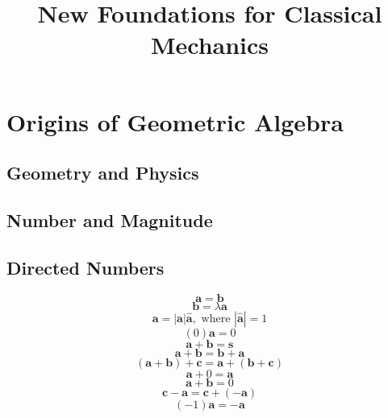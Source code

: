 \documentclass[11pt, a4paper, fleqn]{report}
\title{New Foundations for Classical Mechanics}
\numberwithin{equation}{section}
\def\*#1{\mathbf{#1}}
\begin{document}
\maketitle
\chapter{Origins of Geometric Algebra}
\section{Geometry and Physics}
\section{Number and Magnitude}
\section{Directed Numbers}
\begin{equation}
    \*a = \*b
\end{equation}
\begin{equation}
    \*b = \lambda\*a
\end{equation}
\begin{equation}
    \*a = |\*a|\hat{\*a}, \textrm{ where } |\hat{\*a}|=1
\end{equation}
\begin{equation}
    (0)\*a=0
\end{equation}
\begin{equation}
    \*a+\*b=\*s
\end{equation}
\begin{equation}
    \*a+\*b=\*b+\*a
\end{equation}
\begin{equation}
    (\*a+\*b)+\*c=\*a+(\*b+\*c)
\end{equation}
\begin{equation}
    \*a+0=\*a
\end{equation}
\begin{equation}
    \*a+\*b=0
\end{equation}
\begin{equation}
    \*c-\*a=\*c+(-\*a)
\end{equation}
\begin{equation}
    (-1)\*a=-\*a
\end{equation}
\end{document}
